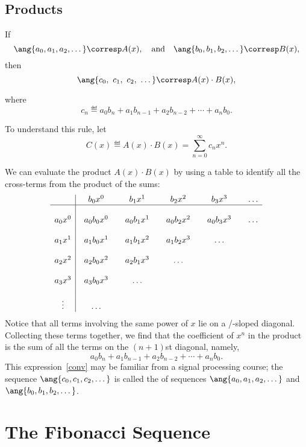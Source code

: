 \subsection{Products}

\begin{mathrule}
\label{rule:product}
If
%
\[
\ang{a_0, a_1, a_2, \dots} \corresp A(x),\quad \text{and}\quad
\ang{b_0, b_1, b_2, \dots} \corresp B(x),
\]
%
then
%
\[
\ang{c_0,\ c_1 ,\ c_2,\ \dots} \corresp A(x) \cdot B(x),
\]
\end{mathrule}
where
\[
c_n \eqdef a_0 b_n + a_1 b_{n-1} + a_2 b_{n-2} + \cdots + a_n b_0.
\]

To understand this rule, let
\[
C(x) \eqdef A(x) \cdot B(x) = \sum_{n=0}^{\infty} c_n x^n.
\]

We can evaluate the product $A(x) \cdot B(x)$ by using a table to identify
all the cross-terms from the product of the sums:
%
\[
\begin{array}{c|@{\quad}c@{\qquad}c@{\qquad}c@{\qquad}c@{\qquad}c}
        & b_0 x^0 & b_1 x^1 & b_2 x^2 & b_3 x^3 & \dots \\
\hline
\\
a_0 x^0 & a_0 b_0 x^0 & a_0 b_1 x^1 & a_0 b_2 x^2 & a_0 b_3 x^3 & \dots \\
\\
a_1 x^1 & a_1 b_0 x^1 & a_1 b_1 x^2 & a_1 b_2 x^3 & \dots \\
\\
a_2 x^2 & a_2 b_0 x^2 & a_2 b_1 x^3 & \dots \\
\\
a_3 x^3 & a_3 b_0 x^3 & \dots \\
\\
\vdots & \dots\\
\end{array}
\]
%
Notice that all terms involving the same power of $x$ lie on a
/-sloped diagonal.  Collecting these terms together, we find that the
coefficient of $x^n$ in the product is the sum of all the terms on the
$(n+1)$st diagonal, namely,
\begin{equation}\label{conv}
a_0 b_n + a_1 b_{n-1} + a_2 b_{n-2} + \cdots + a_n b_0.
\end{equation}
This expression~\eqref{conv} may be familiar from a signal processing
course; the sequence $\ang{c_0, c_1, c_2, \dots}$ is called the
 of sequences $\ang{a_0, a_1, a_2, \dots}$ and
$\ang{b_0, b_1, b_2, \dots}$.

\section{The Fibonacci Sequence}
\label{sec:fibonacci}

